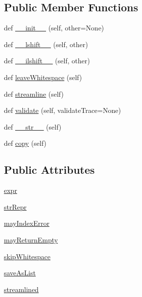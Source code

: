 \subsection*{Public Member Functions}
\begin{DoxyCompactItemize}
\item 
def \hyperlink{classpyparsing_1_1Forward_ad62a5b965ee0e43d6f0f54e6421d99bb}{\+\_\+\+\_\+init\+\_\+\+\_\+} (self, other=None)
\item 
def \hyperlink{classpyparsing_1_1Forward_acd584f18d6afcc397f69f9e6edd883f2}{\+\_\+\+\_\+lshift\+\_\+\+\_\+} (self, other)
\item 
def \hyperlink{classpyparsing_1_1Forward_a4daae336e15a4a9c87d7c1079e5478ef}{\+\_\+\+\_\+ilshift\+\_\+\+\_\+} (self, other)
\item 
def \hyperlink{classpyparsing_1_1Forward_a3a376e835414ef6a74a41fc64c4c27f7}{leave\+Whitespace} (self)
\item 
def \hyperlink{classpyparsing_1_1Forward_a3e7824ecea245fb4ebd2600a6e303207}{streamline} (self)
\item 
def \hyperlink{classpyparsing_1_1Forward_a2c14a4d57922b88fa34a5a298b8ae5e7}{validate} (self, validate\+Trace=None)
\item 
def \hyperlink{classpyparsing_1_1Forward_a0a407692059691b88a76ccb9430c3dd8}{\+\_\+\+\_\+str\+\_\+\+\_\+} (self)
\item 
def \hyperlink{classpyparsing_1_1Forward_a2718f01bc6b16da0cc6c8542fae2fff7}{copy} (self)
\end{DoxyCompactItemize}
\subsection*{Public Attributes}
\begin{DoxyCompactItemize}
\item 
\hyperlink{classpyparsing_1_1Forward_a4f26db29da5f4281b8b12bb9712db12b}{expr}
\item 
\hyperlink{classpyparsing_1_1Forward_a60ad4c71010a194afc91beb0d49e9950}{str\+Repr}
\item 
\hyperlink{classpyparsing_1_1Forward_a260f0945a1f74595e3afa2574b17700c}{may\+Index\+Error}
\item 
\hyperlink{classpyparsing_1_1Forward_af07d7c239f6248fbee69f9094c66110a}{may\+Return\+Empty}
\item 
\hyperlink{classpyparsing_1_1Forward_a5222f8d55e11feffacc3daeab6359f2c}{skip\+Whitespace}
\item 
\hyperlink{classpyparsing_1_1Forward_a87013427b12fe236ecc5faa0ff0816b5}{save\+As\+List}
\item 
\hyperlink{classpyparsing_1_1Forward_a195e42a76b01b6216dc5a496a1b827e9}{streamlined}
\end{DoxyCompactItemize}
